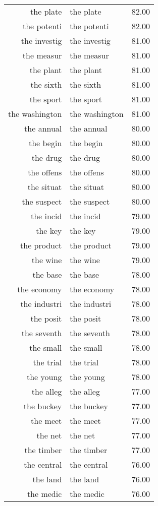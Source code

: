 \begin{table}[ht]
\begin{tabular}{rlr}
  the plate & the plate & 82.00 \\ 
  the potenti & the potenti & 82.00 \\ 
  the investig & the investig & 81.00 \\ 
  the measur & the measur & 81.00 \\ 
  the plant & the plant & 81.00 \\ 
  the sixth & the sixth & 81.00 \\ 
  the sport & the sport & 81.00 \\ 
  the washington & the washington & 81.00 \\ 
  the annual & the annual & 80.00 \\ 
  the begin & the begin & 80.00 \\ 
  the drug & the drug & 80.00 \\ 
  the offens & the offens & 80.00 \\ 
  the situat & the situat & 80.00 \\ 
  the suspect & the suspect & 80.00 \\ 
  the incid & the incid & 79.00 \\ 
  the key & the key & 79.00 \\ 
  the product & the product & 79.00 \\ 
  the wine & the wine & 79.00 \\ 
  the base & the base & 78.00 \\ 
  the economy & the economy & 78.00 \\ 
  the industri & the industri & 78.00 \\ 
  the posit & the posit & 78.00 \\ 
  the seventh & the seventh & 78.00 \\ 
  the small & the small & 78.00 \\ 
  the trial & the trial & 78.00 \\ 
  the young & the young & 78.00 \\ 
  the alleg & the alleg & 77.00 \\ 
  the buckey & the buckey & 77.00 \\ 
  the meet & the meet & 77.00 \\ 
  the net & the net & 77.00 \\ 
  the timber & the timber & 77.00 \\ 
  the central & the central & 76.00 \\ 
  the land & the land & 76.00 \\ 
  the medic & the medic & 76.00 \\ 

\end{tabular}
\end{table}
